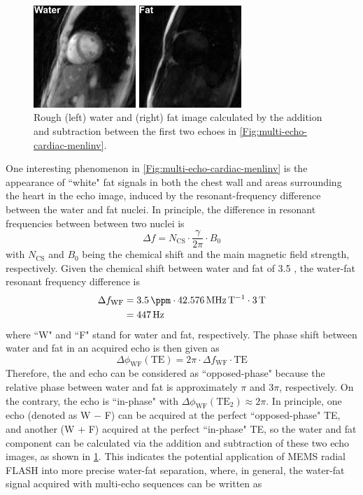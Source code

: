 \begin{figure}[tb]
  \centering
  \includegraphics[width=0.7\textwidth]{fig/multi-echo-cardiac-menlinv-wf.png}
  \caption{Rough (left) water and (right) fat image calculated by the addition and subtraction between the first two echoes in \cref{Fig:multi-echo-cardiac-menlinv}.} \label{Fig:multi-echo-cardiac-menlinv-wf}
\end{figure}
One interesting phenomenon in \cref{Fig:multi-echo-cardiac-menlinv} is the appearance of ``white" fat signals in both the chest wall and areas surrounding the heart in the  echo image, induced by the resonant-frequency difference between the water and fat nuclei. In principle, the difference in resonant frequencies between between two nuclei is 
\begin{equation}
  \Delta f = N_{\text{CS}} \cdot \frac{\gamma}{2\pi} \cdot B_0
\end{equation}
with $N_{\text{CS}}$ and $B_0$ being the chemical shift and the main magnetic field strength, respectively. Given the chemical shift between water and fat of \SI{3.5}{\ppm} \cite{1999_chem_shift}, the water-fat resonant frequency difference is
\begin{align}
  \Delta f_{\text{WF}} 
  &= \SI{3.5}{\ppm} \cdot \SI{42.576}{\mega\hertz\per\tesla} \cdot \SI{3}{\tesla} \nonumber \\
  &= \SI{447}{\hertz}
\end{align}
where ``W" and ``F" stand for water and fat, respectively. The phase shift between water and fat in an acquired echo is then given as
\begin{equation}
  \Delta \phi_{\text{WF}} (\text{TE}) = 2\pi \cdot \Delta f_{\text{WF}} \cdot \text{TE}
\end{equation}
Therefore, the  and  echo can be considered as ``opposed-phase" because the relative phase between water and fat is approximately $\pi$ and $3\pi$, respectively. On the contrary, the  echo is ``in-phase" with $\Delta \phi_{\text{WF}} (\text{TE}_2) \approx 2\pi$. In principle, one echo (denoted as W $-$ F) can be acquired at the perfect ``opposed-phase" TE, and another (W $+$ F) acquired at the perfect ``in-phase" TE, so the water and fat component can be calculated via the addition and subtraction of these two echo images, as shown in \cref{Fig:multi-echo-cardiac-menlinv-wf}. This indicates the potential application of MEMS radial FLASH into more precise water-fat separation, where, in general, the water-fat signal acquired with multi-echo sequences can be written as
